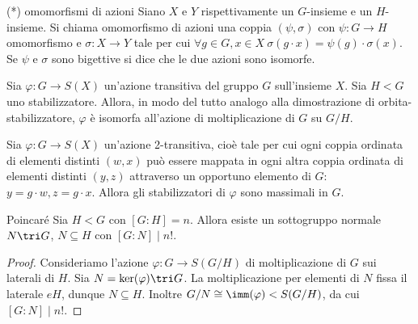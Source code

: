 \begin{definition}{(*) omomorfismi di azioni}
    Siano $X$ e $Y$ rispettivamente un $G$-insieme e un $H$-insieme. Si chiama omomorfismo di azioni una coppia $(\psi, \sigma)$ con $\psi : G \to H$ omomorfismo e $\sigma : X \to Y$ tale per cui $\forall g \in G, x \in X \ \sigma(g \cdot x) = \psi(g) \cdot \sigma(x)$. Se $\psi$ e $\sigma$ sono bigettive si dice che le due azioni sono isomorfe.
\end{definition}
\begin{proposition2}
    Sia $\varphi : G \to S(X)$ un'azione transitiva del gruppo $G$ sull'insieme $X$. Sia $H < G$ uno stabilizzatore. Allora, in modo del tutto analogo alla dimostrazione di orbita-stabilizzatore, $\varphi$ è isomorfa all'azione di moltiplicazione di $G$ su $G/H$.
\end{proposition2}
\begin{exercise}
    Sia $\varphi : G \to S(X)$ un'azione 2-transitiva, cioè tale per cui ogni coppia ordinata di elementi distinti $(w, x)$ può essere mappata in ogni altra coppia ordinata di elementi distinti $(y, z)$ attraverso un opportuno elemento di $G$: $y = g\cdot w, z = g\cdot x$. Allora gli stabilizzatori di $\varphi$ sono massimali in $G$.
\end{exercise}
\begin{theorem}{Poincaré}
    Sia $H < G$ con $[G : H] = n$. Allora esiste un sottogruppo normale $N \tri G$, $N \subseteq H$ con $[G : N] \mid n!$.
\end{theorem}
\begin{proof}
    Consideriamo l'azione $\varphi : G \to S(G / H)$ di moltiplicazione di $G$ sui laterali di $H$. Sia $N = \ker(\varphi) \tri G$. La moltiplicazione per elementi di $N$ fissa il laterale $eH$, dunque $N \subseteq H$. Inoltre $G / N \cong \imm(\varphi) < S(G / H)$, da cui $[G : N] \mid n!$.
\end{proof}

